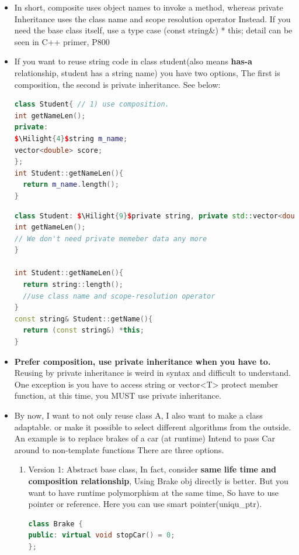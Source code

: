 \documentclass[a4paper,12pt,twoside]{book}
\newcommand{\Hilight}[1]{\makebox[0pt][l]{\color{yellow}\rule[-3pt]{#1em}{11pt}}}
\begin{document}
\begin{itemize}
\item In short, composite uses object names to invoke a method, whereas private Inheritance uses the class name and scope resolution operator Instead. If you need the base class itself, use a type case (const string\&) * this; detail can be seen in C++ primer, P800

\item If you want to reuse string code in class student(also means \textbf{has-a} relationship, student has a string name) you have two options, The first is composition,  the second is private inheritance. See below:
\begin{lstlisting}[frame=single, language=c++, mathescape=true]
class Student{ // 1) use composition.
int getNameLen();
private:
$\Hilight{4}$string m_name;
vector<double> score;
};
int Student::getNameLen(){
  return m_name.length();
}
\end{lstlisting}

\begin{lstlisting}[frame=single, language=c++, mathescape=true]
class Student: $\Hilight{9}$private string, private std::vector<double>{
int getNameLen();
// We don't need private memeber data any more
}

int Student::getNameLen(){
  return string::length();
  //use class name and scope-resolution operator
}
const string& Student::getName(){
  return (const string&) *this;
}
\end{lstlisting}

\item \textbf{Prefer composition, use private inheritance when you have to.} Reusing by private inheritance is weird in syntax and difficult to understand. One exception is you have to access string or vector<T> protect member function, at this time, you MUST use private inheritance.

\item By now, I want to not only reuse class A, I also want to make a class adaptable. or make it possible to select different algorithms from the outside.  An example is  to replace brakes of a car (at runtime) Intend to pass Car around to non-template functions There are three options.
\begin{enumerate}
\item Version 1: Abstract base class, In fact, consider \textbf{same life time and composition relationship},  Using Brake obj directly is better. But you want to have runtime polymorphism at the same time, So have to use pointer or reference. Here you can use smart pointer(uniqu\_ptr).
\begin{lstlisting}[frame=single, language=c++]
class Brake {
public: virtual void stopCar() = 0;
};


\end{lstlisting}
\end{enumerate}
\end{itemize}
\end{document}
